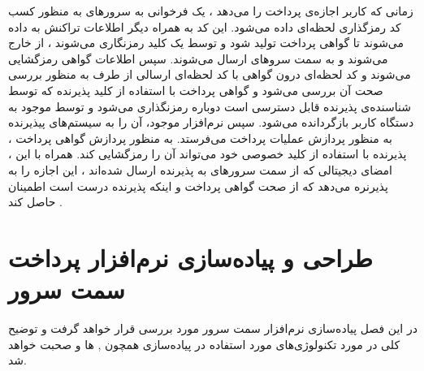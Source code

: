 \documentclass[oneside]{report}
\begin{document}
  زمانی که کاربر اجازه‌ی پرداخت را می‌دهد ، یک فرخوانی به سرورهای 
  {\normalsize {}} 
  به منظور کسب کد رمزگذاری لحظه‌ای 
     داده می‌شود. این کد به همراه دیگر اطلاعات تراکنش به 
      {\normalsize {}} 
      داده می‌شوند تا گواهی پرداخت 
      تولید شود و توسط یک کلید 
       {\normalsize {}} 
    رمزنگاری می‌شوند ، از 
     {\normalsize {}} 
     خارج می‌شوند 
    و به سمت سروهای 
     {\normalsize {}} 
     ارسال می‌شوند. سپس اطلاعات گواهی رمزگشایی می‌شوند و کد لحظه‌ای درون گواهی با کد لحظه‌ای ارسالی از طرف 
          {\normalsize {}} 
    به منظور بررسی صحت آن بررسی می‌شود و گواهی پرداخت با استفاده از کلید پذیرنده که توسط شناسنده‌ی پذیرنده قابل دسترسی است دوباره رمزنگذاری می‌شود و  توسط 
         {\normalsize {}} 
         موجود به دستگاه کاربر بازگردانده می‌شود.  سپس نرم‌افزار موجود، آن را به سیستم‌های پیذیرنده به منظور پردازش عملیات پرداخت می‌فرستد. به منظور پردازش گواهی پرداخت ، پذیرنده با استفاده از کلید خصوصی 
         خود می‌تواند آن را رمزگشایی کند. همراه با این ، امضای دیجیتالی که از سمت سرورهای 
         {\normalsize {}} 
                به پذیرنده ارسال شده‌اند ، این اجازه را به پذیرنره می‌دهد که از صحت گواهی پرداخت و اینکه پذیرنده درست است اطمینان حاصل کند .      
      \cite{iossecurity}
      
      \section{{\large{}}}
   
      
      
      
               
               
 
		
		
		\chapter{طراحی و پیاده‌سازی نرم‌افزار پرداخت سمت سرور}\label{serverimplementation}
در این فصل پیاده‌سازی نرم‌افزار سمت سرور 
 مورد بررسی قرار خواهد گرفت و توضیح کلی در مورد تکنولوژی‌های مورد استفاده در پیاده‌سازی همچون 
         {\normalsize {}}
         , 
                  {\normalsize {}} ها
                  و 
                           {\normalsize {}}
                              صحبت خواهد شد. 
                              
\end{document}
